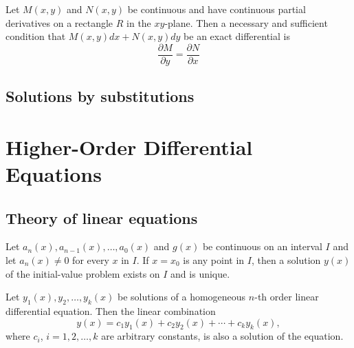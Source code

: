 \documentclass{article}
\begin{document}
\begin{thm} 
    Let \(M(x,y)\) and \(N(x,y)\) be continuous and have continuous partial derivatives on a rectangle \(R\) in the \(xy\)-plane. Then a necessary and sufficient condition that \(M(x,y)dx + N(x,y)dy\) be an exact differential is
        \begin{equation}
            \frac{\partial M}{\partial y} = \frac{\partial N}{\partial x}
        \end{equation}
\end{thm}

\subsection{Solutions by substitutions}

\section{Higher-Order Differential Equations}

\subsection{Theory of linear equations}

\begin{thm} 
Let \(a_n(x), a_{n-1}(x), \ldots, a_0(x)\) and \(g(x)\) be continuous on an interval \(I\) and let \(a_n(x)\neq 0\) for every \(x\) in \(I\). If \(x = x_0\) is any point in \(I\), then a solution \(y(x)\) of the initial-value problem exists on \(I\) and is unique.
\end{thm}

\begin{thm} 
    Let \(y_1(x), y_2, \ldots, y_k(x)\) be solutions of a homogeneous \(n\)-th order linear differential equation. Then the linear combination
    \begin{equation}
        y(x) = c_1y_1(x) + c_2y_2(x) + \cdots + c_ky_k(x),
    \end{equation}
    where \(c_i\), \(i = 1, 2, \ldots, k\) are arbitrary constants, is also a solution of the equation.
\end{thm}
\end{document}
